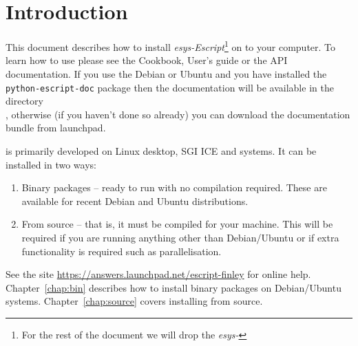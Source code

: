 %
%
%

\chapter{Introduction}
This document describes how to install \emph{esys-Escript}\footnote{For the rest of the document we will drop the \emph{esys-}} on to your computer.
To learn how to use \esfinley please see the Cookbook, User's guide or the API documentation.
If you use the Debian or Ubuntu and you have installed the \texttt{python-escript-doc} package then the documentation 
will be available in the directory\\
, otherwise (if you haven't done so already) you can download the documentation bundle 
from launchpad.



\esfinley is primarily developed on Linux desktop, SGI ICE and \macosx systems.
It can be installed in two ways:
\begin{enumerate}
  \item Binary packages -- ready to run with no compilation required. These are available for recent Debian and Ubuntu distributions.
  \item From source -- that is, it must be compiled for your machine.
  This will be required if you are running anything other than Debian/Ubuntu 
  or if extra functionality is required such as \mpi parallelisation.
\end{enumerate}

See the site \url{https://answers.launchpad.net/escript-finley} for online help.
Chapter~\ref{chap:bin} describes how to install binary packages on Debian/Ubuntu systems.
Chapter~\ref{chap:source} covers installing from source.



